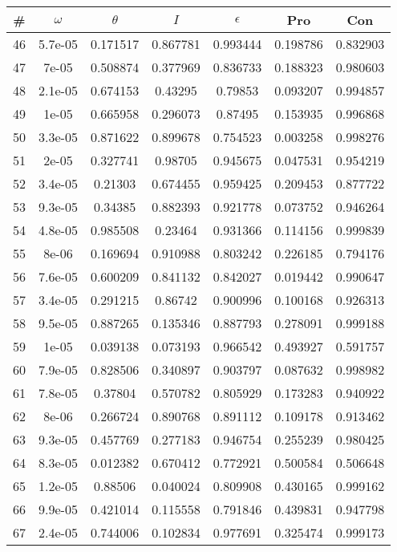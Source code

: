 \newpage
\begin{table}
\begin{tabular}{c|c|c|c|c|c|c}
\# & $\omega$ & $\theta$ & $I$ & $\epsilon$ & Pro & Con\\
\hline
46 & 5.7e-05 & 0.171517 & 0.867781 & 0.993444 & 0.198786 & 0.832903\\
47 & 7e-05 & 0.508874 & 0.377969 & 0.836733 & 0.188323 & 0.980603\\
48 & 2.1e-05 & 0.674153 & 0.43295 & 0.79853 & 0.093207 & 0.994857\\
49 & 1e-05 & 0.665958 & 0.296073 & 0.87495 & 0.153935 & 0.996868\\
50 & 3.3e-05 & 0.871622 & 0.899678 & 0.754523 & 0.003258 & 0.998276\\
51 & 2e-05 & 0.327741 & 0.98705 & 0.945675 & 0.047531 & 0.954219\\
52 & 3.4e-05 & 0.21303 & 0.674455 & 0.959425 & 0.209453 & 0.877722\\
53 & 9.3e-05 & 0.34385 & 0.882393 & 0.921778 & 0.073752 & 0.946264\\
54 & 4.8e-05 & 0.985508 & 0.23464 & 0.931366 & 0.114156 & 0.999839\\
55 & 8e-06 & 0.169694 & 0.910988 & 0.803242 & 0.226185 & 0.794176\\
56 & 7.6e-05 & 0.600209 & 0.841132 & 0.842027 & 0.019442 & 0.990647\\
57 & 3.4e-05 & 0.291215 & 0.86742 & 0.900996 & 0.100168 & 0.926313\\
58 & 9.5e-05 & 0.887265 & 0.135346 & 0.887793 & 0.278091 & 0.999188\\
59 & 1e-05 & 0.039138 & 0.073193 & 0.966542 & 0.493927 & 0.591757\\
60 & 7.9e-05 & 0.828506 & 0.340897 & 0.903797 & 0.087632 & 0.998982\\
61 & 7.8e-05 & 0.37804 & 0.570782 & 0.805929 & 0.173283 & 0.940922\\
62 & 8e-06 & 0.266724 & 0.890768 & 0.891112 & 0.109178 & 0.913462\\
63 & 9.3e-05 & 0.457769 & 0.277183 & 0.946754 & 0.255239 & 0.980425\\
64 & 8.3e-05 & 0.012382 & 0.670412 & 0.772921 & 0.500584 & 0.506648\\
65 & 1.2e-05 & 0.88506 & 0.040024 & 0.809908 & 0.430165 & 0.999162\\
66 & 9.9e-05 & 0.421014 & 0.115558 & 0.791846 & 0.439831 & 0.947798\\
67 & 2.4e-05 & 0.744006 & 0.102834 & 0.977691 & 0.325474 & 0.999173\\

\end{tabular}
\end{table}
